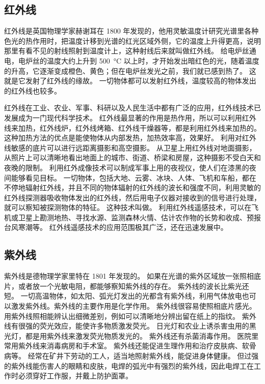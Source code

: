 \subsection{红外线}
红外线是英国物理学家赫谢耳在 1800 年发现的，他用灵敏温度计研究光谱里各种色光的热作用时，把温度计移到光谱的红光区域外侧，它的温度上升得更高，说明那里有看不见的射线照射到温度计上，这种射线后来就叫做红外线。
给电炉丝通电，电炉丝的温度大约上升到 \qty{500}{\celsius} 以上时，才开始发出暗红色的光，随着温度的升高，它逐渐变成橙色、黄色；但在电炉丝发光之前，我们就已感到热了。
这就是它发射了红外线的缘故。
一切物体都可以发射红外线，温度较高的物体发出的红外线也较多。

红外线在工业、农业、军事、科研以及人民生活中都有广泛的应用，红外线技术已发展成为一门现代科学技术。
红外线最显著的作用是热作用，所以可以利用红外线来加热，红外线炉，红外线烤箱、红外线干燥器等，都是利用红外线来加热的。
这种加热方法的优点是能使物体从内部发热，加热效率高，效果好。
利用对红外线敏感的底片可以进行远距离摄影和高空摄影。
从卫星上用红外线对地面摄影，从照片上可以清晰地看出地面上的城市、街道、桥梁和房屋，这种摄影不受白天和夜晚的限制。
利用红外成像技术可以制成军事上用的夜视仪，使人们在漆黑的夜间能够看见目标。
一切物体，包括大地、云雾、冰块、人体、飞机和车船，都在不停地辐射红外线，并且不同的物体辐射的红外线的波长和强度不同，利用灵敏的红外线探测器吸收物体发出的红外线，然后用电子仪器对接收到的信号进行处理，就可以察知被探测物体的特征。
这种技术叫做。
利用红外线遥感技术，可以在飞机或卫星上勘测地热、寻找水源、监测森林火情、估计农作物的长势和收成、预报台风寒潮等。
红外线遥感技术的应用范围极其广泛，还在迅速发展中。

\subsection{紫外线}
紫外线是德物理学家里特在 1801 年发现的。
如果在光谱的紫外区域放一张照相底片，或者放一个光敏电阻，都能够察知紫外线的存在。
紫外线的波长比紫光还短。
一切高温物体，如太阳、弧光灯发出的光都含有紫外线，利用气体放电也可以激发紫外线。紫外线的主要作用是化学作用。
紫外线很容易使照相底片感光。
用紫外线照相能辨认出细微差别，例如可以清晰地分辨出留在纸上的指纹。
紫外线有很强的荧光效应，能使许多物质激发荧光。
日光灯和农业上诱杀害虫用的黑光灯，都是用紫外线来激发荧光物质发光的。
紫外线还有杀菌消毒作用。
医院里常用紫外线来消毒病房和手术室。
紫外线还能促进生理作用和治疗皮肤病、软骨病等。
经常在矿井下劳动的工人，适当地照射紫外线，能促进身体健康。
但过强的紫外线能伤害人的眼睛和皮肤，电焊的弧光中有强烈的紫外线，因此电焊工在工作时必须穿好工作服，并戴上防护面罩。


